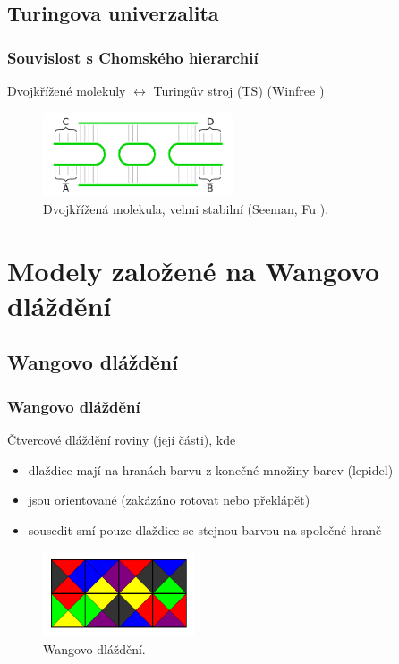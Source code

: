 \documentclass[10pt]{beamer}
\theoremstyle{definition}
\theoremstyle{remark}
\begin{document}
\subsection{Turingova univerzalita}
\begin{frame}
\frametitle{Souvislost s Chomského hierarchií}
	Dvojkřížené molekuly $\leftrightarrow$ Turingův stroj (TS) (Winfree \cite{winfree_phd})
	\begin{figure}[h]
	\begin{center}
		\includegraphics[width=0.502\textwidth]{../figures/strand_types/double_crossover.pdf} %
		\caption{Dvojkřížená molekula, velmi stabilní (Seeman, Fu \cite{seeman93}).}
	\end{center}
	\end{figure}
\end{frame}

\section{Modely založené na Wangovo dláždění}
\subsection{Wangovo dláždění}
\begin{frame}
\frametitle{Wangovo dláždění}
	Čtvercové dláždění roviny (její části), kde
	\begin{itemize}
		\item dlaždice mají na hranách barvu z konečné množiny barev (lepidel)
		\item jsou orientované (zakázáno rotovat nebo překlápět)
		\item sousedit smí pouze dlaždice se stejnou barvou na společné hraně
	\end{itemize}
	\begin{figure}[h]
	\begin{center}
		\includegraphics[width=0.4\textwidth]{../figures/wang_tiling/wang_tiling.pdf} %
		\caption{Wangovo dláždění.}
	\end{center}
	\end{figure}
\end{frame}
\end{document}
